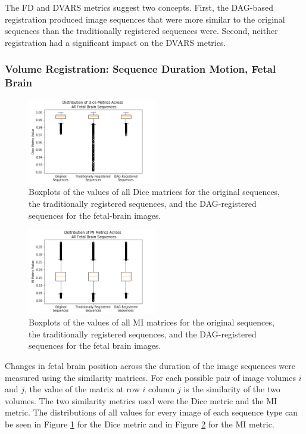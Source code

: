 The FD and DVARS metrics suggest two concepts. First, the DAG-based registration produced image sequences that were more similar to the original sequences than the traditionally registered sequences were. Second, neither registration had a significant impact on the DVARS metrics.

\subsubsection{Volume Registration: Sequence Duration Motion, Fetal Brain}

\begin{figure}[t!]
\centering
\includegraphics[width=0.5\textwidth]{6/figures/fetal-brain-dice-box.png}
\caption{Boxplots of the values of all Dice matrices for the original sequences, the traditionally registered sequences, and the DAG-registered sequences for the fetal-brain images.}
\label{fig:fetal-brain-dice-box}
\end{figure}

\begin{figure}[t!]
\centering
\includegraphics[width=0.5\textwidth]{6/figures/fetal-brain-mi-box.png}
\caption{Boxplots of the values of all MI matrices for the original sequences, the traditionally registered sequences, and the DAG-registered sequences for the fetal brain images.}
\label{fig:fetal-brain-mi-box}
\end{figure}

Changes in fetal brain position across the duration of the image sequences were measured using the similarity matrices. For each possible pair of image volumes $i$ and $j$, the value of the matrix at row $i$ column $j$ is the similarity of the two volumes. The two similarity metrics used were the Dice metric and the MI metric. The distributions of all values for every image of each sequence type can be seen in Figure \ref{fig:fetal-brain-dice-box} for the Dice metric and in Figure \ref{fig:fetal-brain-mi-box} for the MI metric.

